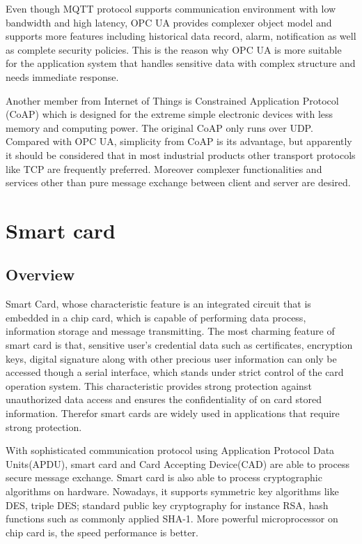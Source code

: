 Even though MQTT protocol supports communication environment with low bandwidth and high latency, OPC UA provides complexer object model and supports more features including historical data record, alarm, notification as well as complete security policies. This is the reason why OPC UA is more suitable for the application system that handles sensitive data with complex structure and needs immediate response.


Another member from Internet of Things is Constrained Application Protocol (CoAP)\cite{Ref5} which is designed for the extreme simple electronic devices with less memory and computing power. The original CoAP only runs over UDP. Compared with OPC UA, simplicity from CoAP is its advantage, but apparently it should be considered that in most industrial products other transport protocols like TCP are frequently preferred. Moreover complexer functionalities and services other than pure message exchange between client and server are desired.

\section{Smart card}
\subsection{Overview}
Smart Card, whose characteristic feature is an integrated circuit that is embedded in a chip card, which is capable of performing data process, information storage and message transmitting\cite{handbuch}. The most charming feature of smart card is that, sensitive user's credential data such as certificates, encryption keys, digital signature along with other precious user information can only be accessed though a serial interface, which stands under  strict control of the card operation system. This characteristic provides strong  protection against  unauthorized data access and ensures the confidentiality of on card stored information. Therefor smart cards are widely used in applications that require strong protection.

With sophisticated communication protocol using Application Protocol Data Units(APDU), smart card and Card Accepting Device(CAD) are able to process secure message exchange. Smart card is also able to process cryptographic algorithms on hardware. Nowadays, it supports symmetric key algorithms like DES, triple DES; standard public key cryptography for instance RSA, hash functions such as commonly applied SHA-1\cite{handbuch}. More powerful microprocessor on chip card is, the speed performance is better.  

